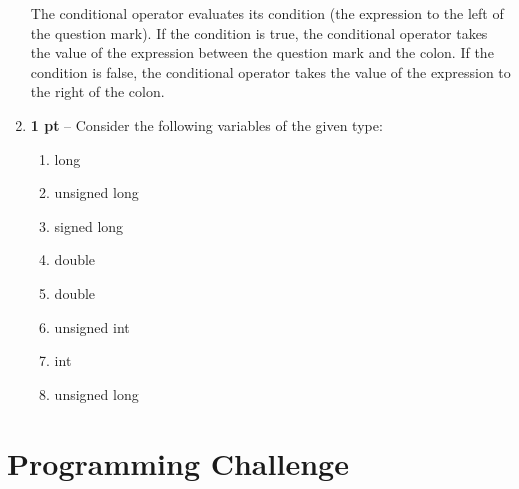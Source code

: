 \documentclass{article}
\begin{document}
\begin{enumerate}
    The conditional operator evaluates its condition (the expression to the left
    of the question mark).  If the condition is true, the conditional operator
    takes the value of the expression between the question mark and the colon.
    If the condition is false, the conditional operator takes the value of the
    expression to the right of the colon.

  \item \textbf{1 pt} -- Consider the following variables of the given type:
    \begin{enumerate}
      \item long
      \item unsigned long
      \item signed long
      \item double
      \item double
      \item unsigned int
      \item int
      \item unsigned long
    \end{enumerate}
\end{enumerate}

\section*{Programming Challenge}
\inputminted[bgcolor=lightgray]{bash}{summary-stats-output}
\end{document}
